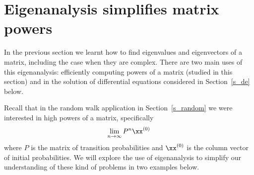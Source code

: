 \section{Eigenanalysis simplifies matrix powers}

In the previous section we learnt how to find eigenvalues and
eigenvectors of a matrix, including the case when they are
complex. There are two main uses of this eigenanalysis: efficiently
computing powers of a matrix (studied in this section) and in the
solution of differential equations considered in Section~\ref{s_de}
below. 

Recall that in the random walk application in Section~\ref{s_random}
we were interested in high powers of a matrix, specifically
\[
\lim_{n \rightarrow \infty} P^n \xx^{(0)}
\]
where $P$ is the matrix of transition probabilities and $\xx^{(0)}$ is
the column vector of initial probabilities. We will explore the use of
eigenanalysis to simplify our understanding of these kind of
problems in two examples below. 

